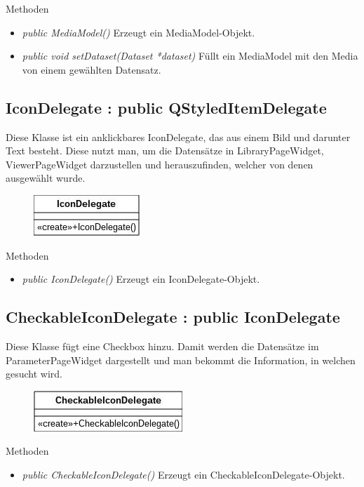 Methoden
\begin{itemize}
	\item\textit{public MediaModel()}
	Erzeugt ein MediaModel-Objekt.
	\item\textit{public void setDataset(Dataset *dataset)}
	Füllt ein MediaModel mit den Media von einem gewählten Datensatz.
\end{itemize}

\subsection*{IconDelegate : public QStyledItemDelegate}
Diese Klasse ist ein anklickbares IconDelegate, das aus einem Bild und darunter Text besteht. Diese nutzt man, um die Datensätze in LibraryPageWidget, ViewerPageWidget darzustellen und herauszufinden, welcher von denen ausgewählt wurde.

\begin{figure}[H]
	\centering
	\includegraphics[scale=0.5]{img/Klassendiagramm/Klassen/View/IconDelegate}
	\label{fig:iconDelegate}
\end{figure}

Methoden
\begin{itemize}
	\item\textit{public IconDelegate()}
	Erzeugt ein IconDelegate-Objekt.
\end{itemize}

\subsection*{CheckableIconDelegate : public IconDelegate}
Diese Klasse fügt eine Checkbox hinzu. Damit werden die Datensätze im ParameterPageWidget dargestellt und man bekommt die Information, in welchen gesucht wird.

\begin{figure}[H]
	\centering
	\includegraphics[scale=0.5]{img/Klassendiagramm/Klassen/View/CheckableIconDelegate}
	\label{fig:checkableIconDelegate}
\end{figure}

Methoden
\begin{itemize}
	\item\textit{public CheckableIconDelegate()}
	Erzeugt ein CheckableIconDelegate-Objekt.
\end{itemize} 

